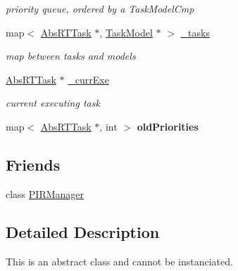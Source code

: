 \begin{DoxyCompactItemize}
\begin{DoxyCompactList}\small\item\em priority queue, ordered by a Task\+Model\+Cmp \end{DoxyCompactList}\item 
map$<$ \hyperlink{classRTSim_1_1AbsRTTask}{Abs\+R\+T\+Task} $\ast$, \hyperlink{classRTSim_1_1TaskModel}{Task\+Model} $\ast$ $>$ \hyperlink{classRTSim_1_1Scheduler_aae4581d41b95eff8d4ab1a0626b22587}{\+\_\+tasks}\hypertarget{classRTSim_1_1Scheduler_aae4581d41b95eff8d4ab1a0626b22587}{}\label{classRTSim_1_1Scheduler_aae4581d41b95eff8d4ab1a0626b22587}

\begin{DoxyCompactList}\small\item\em map between tasks and models \end{DoxyCompactList}\item 
\hyperlink{classRTSim_1_1AbsRTTask}{Abs\+R\+T\+Task} $\ast$ \hyperlink{classRTSim_1_1Scheduler_aa7af28afff97d36809d05e447c7232d5}{\+\_\+curr\+Exe}\hypertarget{classRTSim_1_1Scheduler_aa7af28afff97d36809d05e447c7232d5}{}\label{classRTSim_1_1Scheduler_aa7af28afff97d36809d05e447c7232d5}

\begin{DoxyCompactList}\small\item\em current executing task \end{DoxyCompactList}\item 
map$<$ \hyperlink{classRTSim_1_1AbsRTTask}{Abs\+R\+T\+Task} $\ast$, int $>$ {\bfseries old\+Priorities}\hypertarget{classRTSim_1_1Scheduler_a98d007527f6dc8c5edace1c643681b98}{}\label{classRTSim_1_1Scheduler_a98d007527f6dc8c5edace1c643681b98}

\end{DoxyCompactItemize}
\subsection*{Friends}
\begin{DoxyCompactItemize}
\item 
class \hyperlink{classRTSim_1_1Scheduler_aa1f247653b81e44ca2fc343b8aa88e13}{P\+I\+R\+Manager}
\end{DoxyCompactItemize}


\subsection{Detailed Description}
This is an abstract class and cannot be instanciated.

